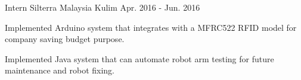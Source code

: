 

\begin{cventries}

  \cventry
    {Intern}
    {Silterra Malaysia}
    {Kulim}
    {Apr. 2016 - Jun. 2016}
    {
      \begin{cvitems}
        \item {Implemented Arduino system that integrates with a MFRC522 RFID model for company saving budget purpose.}
        \item {Implemented Java system that can automate robot arm testing for future maintenance and robot fixing.}
      \end{cvitems}
    }

\end{cventries}
